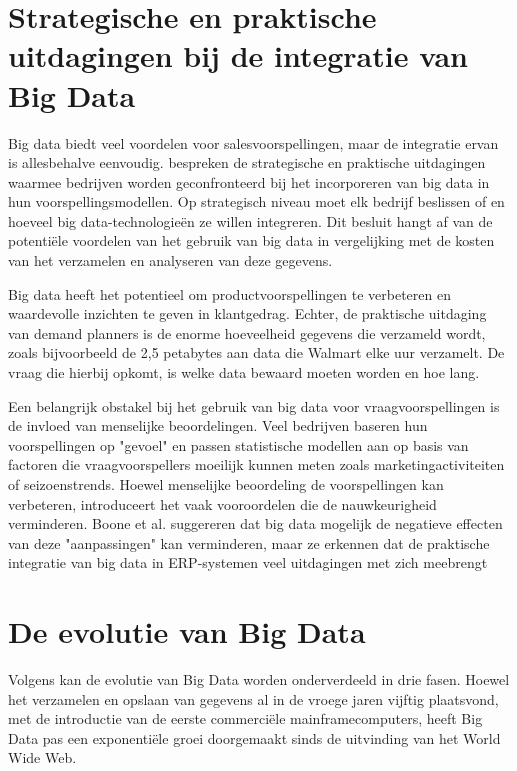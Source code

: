 \section{Strategische en praktische uitdagingen bij de integratie van Big Data}  
Big data biedt veel voordelen voor salesvoorspellingen, maar de integratie ervan is allesbehalve eenvoudig. \textcite{Boone2019} bespreken de strategische en praktische uitdagingen waarmee bedrijven worden geconfronteerd bij het incorporeren van big data in hun voorspellingsmodellen. Op strategisch niveau moet elk bedrijf beslissen of en hoeveel big data-technologieën ze willen integreren. Dit besluit hangt af van de potentiële voordelen van het gebruik van big data in vergelijking met de kosten van het verzamelen en analyseren van deze gegevens. 

\vspace{1 em}

Big data heeft het potentieel om productvoorspellingen te verbeteren en waardevolle inzichten te geven in klantgedrag. Echter, de praktische uitdaging van demand planners is de enorme hoeveelheid gegevens die verzameld wordt, zoals bijvoorbeeld de 2,5 petabytes aan data die Walmart elke uur verzamelt. De vraag die hierbij opkomt, is welke data bewaard moeten worden en hoe lang. 

\vspace{45 mm}

Een belangrijk obstakel bij het gebruik van big data voor vraagvoorspellingen is de invloed van menselijke beoordelingen. Veel bedrijven baseren hun voorspellingen op "gevoel" en passen statistische modellen aan op basis van factoren die vraagvoorspellers moeilijk kunnen meten zoals marketingactiviteiten of seizoenstrends. Hoewel menselijke beoordeling de voorspellingen kan verbeteren, introduceert het vaak vooroordelen die de nauwkeurigheid verminderen. Boone et al. suggereren dat big data mogelijk de negatieve effecten van deze "aanpassingen" kan verminderen, maar ze erkennen dat de praktische integratie van big data in ERP-systemen veel uitdagingen met zich meebrengt

\section{De evolutie van Big Data}  

Volgens \textcite{Lee2017} kan de evolutie van Big Data worden onderverdeeld in drie fasen. Hoewel het verzamelen en opslaan van gegevens al in de vroege jaren vijftig plaatsvond, met de introductie van de eerste commerciële mainframecomputers, heeft Big Data pas een exponentiële groei doorgemaakt sinds de uitvinding van het World Wide Web.


